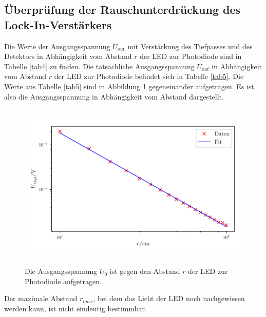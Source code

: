 \subsection{Überprüfung der Rauschunterdrückung des Lock-In-Verstärkers}
Die Werte der Ausgangsspannung $U_{out}$ mit Verstärkung des Tiefpasses und des Detektors in Abhängigkeit vom Abstand $r$ der LED
zur Photodiode sind in Tabelle \ref{tab4} zu finden.
Die tatsächliche Ausgangsspannung $U_{out}$ in Abhängigkeit vom Abstand $r$ der LED
zur Photodiode befindet sich in Tabelle \ref{tab5}.
Die Werte aus Tabelle \ref{tab5} sind in Abbildung \ref{fig:plot4}
gegeneinander aufgetragen. Es ist also die Ausgangsspannung in Abhängigkeit
vom Abstand dargestellt.



\begin{figure}
    \centering
    \includegraphics[width=12cm, height=8cm]{build/plot4.pdf}
    \caption{Die Ausgangsspannung $U_{0}$ ist gegen den Abstand $r$ der LED zur Photodiode aufgetragen.}
    \label{fig:plot4}
\end{figure}

\noindent Der maximale Abstand $r_{max}$, bei dem das Licht der LED %
noch nachgewiesen werden kann, ist nicht eindeutig bestimmbar. 
